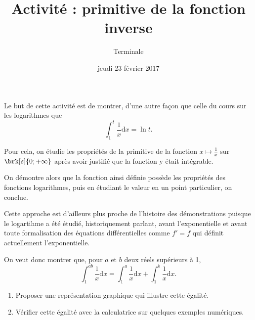 \documentclass[12pt,a4paper,french]{article}
\title{Activité : primitive de la fonction inverse}
\author{Terminale}
\date{jeudi 23 février 2017}
\makeatletter
\renewcommand{\maketitle}%
{\framebox{%
    \begin{minipage}{0.98\linewidth}%
      \begin{center}%
        \Large \@title ~-- \@author \\%
        \@date%
      \end{center}%
  \end{minipage}}%
  \normalsize%
}
\theoremstyle{break}
\theoremstyle{break}
\theoremstyle{nonumberplain}
\makeatother
\begin{document}
\maketitle

\bigskip

Le but de cette activité est de montrer, d'une autre façon que celle du
cours sur les logarithmes que \[ \int_1^t \frac1x \mathrm{d}x = \ln t
.\]

Pour cela, on étudie les propriétés de la primitive de la fonction $x
\mapsto \frac1x$ sur $\brk[s]{0;+\infty}$ après avoir justifié que la
fonction y était intégrable.

On démontre alors que la fonction ainsi définie possède les propriétés
des fonctions logarithmes, puis en étudiant le valeur en un point
particulier, on conclue.

Cette approche est d'ailleurs plus proche de l'histoire des
démonstrations puisque le logartihme a été étudié, historiquement
parlant, avant l'exponentielle et avant toute formalisation des
équations différentielles comme $f' = f$ qui définit actuellement
l'exponentielle.

\begin{center}
\end{center}

On veut donc montrer que, pour $a$ et $b$ deux réels supérieurs à 1, \[
\int_1^{ab} \frac1x \mathrm{d}x = \int_1^a \frac1x \mathrm{d}x +
\int_1^b \frac 1x \mathrm{d}x .\]

\begin{enumerate}
  \item Proposer une représentation graphique qui illustre cette
    égalité.
  \item Vérifier cette égalité avec la calculatrice sur quelques
    exemples numériques.
\end{enumerate}

\pagebreak
\end{document}
